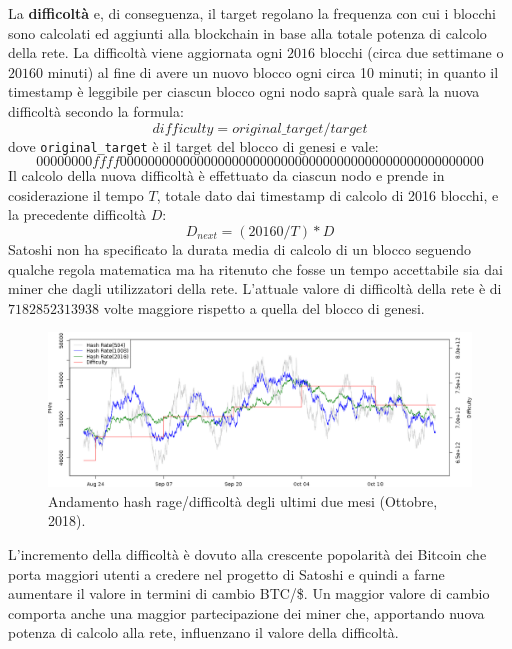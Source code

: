 \begin{enumerate}[1.]
La \textbf{difficoltà} e, di conseguenza, il target regolano la frequenza con cui i blocchi sono calcolati ed aggiunti alla blockchain in base alla totale potenza di calcolo della rete. La difficoltà viene aggiornata ogni $2016$ blocchi (circa due settimane o $20160$ minuti) al fine di avere un nuovo blocco ogni circa 10 minuti; in quanto il timestamp è leggibile per ciascun blocco ogni nodo saprà quale sarà la nuova difficoltà secondo la formula:
\begin{equation}
     difficulty = original\_target / target
\end{equation}
dove \texttt{original\_target} è il target del blocco di genesi e vale:
\begin{equation}
    00000000ffff0000000000000000000000000000000000000000000000000000
\end{equation}
Il calcolo della nuova difficoltà è effettuato da ciascun nodo e prende in cosiderazione il tempo $T$, totale dato dai timestamp di calcolo di 2016 blocchi, e la precedente difficoltà $D$:
\begin{equation}
    D_{next} = (20160 / T) * D
\end{equation}
Satoshi non ha specificato la durata media di calcolo di un blocco seguendo qualche regola matematica ma ha ritenuto che fosse un tempo accettabile sia dai miner che dagli utilizzatori della rete.\newline
L'attuale valore di difficoltà della rete è di $7182852313938$ volte maggiore rispetto a quella del blocco di genesi.
\begin{figure}[H]
    \centering
    \includegraphics[width=\textwidth]{images/diffvshash.png}
    \caption{Andamento hash rage/difficoltà degli ultimi due mesi (Ottobre, 2018).}
\end{figure}
L'incremento della difficoltà è dovuto alla crescente popolarità dei Bitcoin che porta maggiori utenti a credere nel progetto di Satoshi e quindi a farne aumentare il valore in termini di cambio BTC/\$. Un maggior valore di cambio comporta anche una maggior partecipazione dei miner che, apportando nuova potenza di calcolo alla rete, influenzano il valore della difficoltà.

\end{enumerate}

